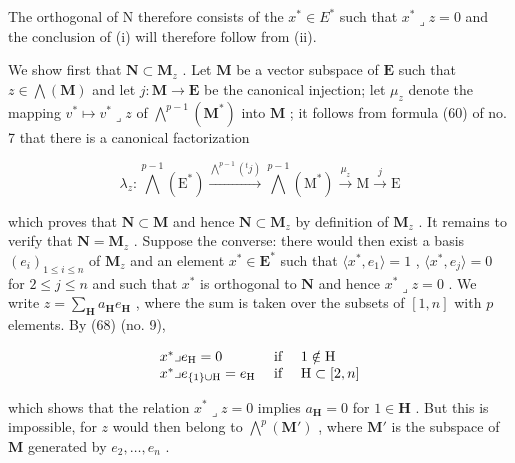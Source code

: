 The orthogonal of N therefore consists of the \(x^{*} \in E^{*}\) such that \(x^{*} \lrcorner z = 0\) and the conclusion of (i) will therefore follow from (ii).

We show first that \(\mathbf{N} \subset \mathbf{M}_z\) . Let \(\mathbf{M}\) be a vector subspace of \(\mathbf{E}\) such that \(z \in \bigwedge (\mathbf{M})\) and let \(j: \mathbf{M} \to \mathbf{E}\) be the canonical injection; let \(\mu_z\) denote the mapping \(v^* \mapsto v^* \lrcorner z\) of \(\bigwedge^{p-1}(\mathbf{M}^*)\) into \(\mathbf{M}\) ; it follows from formula (60) of no. 7 that there is a canonical factorization

\[
\lambda_ {z}: \bigwedge^ {p - 1} (\mathrm{E} ^ {*}) \xrightarrow {\bigwedge^ {p - 1} ({} ^ {t} j)} \bigwedge^ {p - 1} (\mathrm{M} ^ {*}) \xrightarrow {\mu_ {z}} \mathrm{M} \xrightarrow {j} \mathrm{E}
\]

which proves that \(\mathbf{N} \subset \mathbf{M}\) and hence \(\mathbf{N} \subset \mathbf{M}_z\) by definition of \(\mathbf{M}_z\) . It remains to verify that \(\mathbf{N} = \mathbf{M}_z\) . Suppose the converse: there would then exist a basis \((e_i)_{1 \leqslant i \leqslant n}\) of \(\mathbf{M}_z\) and an element \(x^* \in \mathbf{E}^*\) such that \(\langle x^*, e_1 \rangle = 1\) , \(\langle x^*, e_j \rangle = 0\) for \(2 \leqslant j \leqslant n\) and such that \(x^*\) is orthogonal to \(\mathbf{N}\) and hence \(x^* \lrcorner z = 0\) . We write \(z = \sum_{\mathbf{H}} a_{\mathbf{H}} e_{\mathbf{H}}\) , where the sum is taken over the subsets of \([1, n]\) with \(p\) elements. By (68) (no. 9),

\[
\begin{array}{l l} x ^ {*} \lrcorner e _ {\mathrm{H}} = 0 & \text { if } \quad 1 \notin \mathrm{H} \\ x ^ {*} \lrcorner e _ {\{1 \} \cup \mathrm{H}} = e _ {\mathrm{H}} & \text { if } \quad \mathrm{H} \subset [ 2, n ] \end{array}
\]

which shows that the relation \(x^{*} \lrcorner z = 0\) implies \(a_{\mathbf{H}} = 0\) for \(1 \in \mathbf{H}\) . But this is impossible, for \(z\) would then belong to \(\bigwedge^{p}(\mathbf{M}')\) , where \(\mathbf{M}'\) is the subspace of \(\mathbf{M}\) generated by \(e_2, \ldots, e_n\) .


